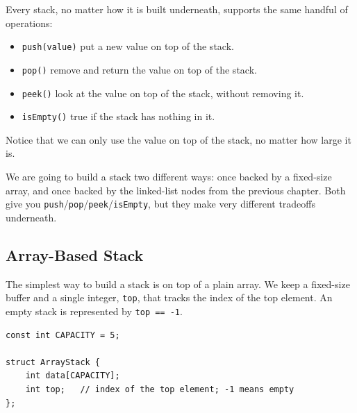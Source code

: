 Every stack, no matter how it is built underneath, supports the same handful of operations:

\begin{itemize}
    \item {}\texttt{push(value)} put a new value on top of the stack.
    \item {}\texttt{pop()} remove and return the value on top of the stack.
    \item {}\texttt{peek()} look at the value on top of the stack, without removing it.
    \item \texttt{isEmpty()} true if the stack has nothing in it.
\end{itemize}

Notice that we can only use the value on top of the stack, no matter how large it is.

We are going to build a stack two different ways: once backed by a fixed-size array, and once backed by the linked-list nodes from the previous chapter. Both give you \texttt{push}/\texttt{pop}/\texttt{peek}/\texttt{isEmpty}, but they make very different tradeoffs underneath.

\subsection{Array-Based Stack}

The simplest way to build a stack is on top of a plain array. We keep a fixed-size buffer and a single integer, \texttt{top}, that tracks the index of the top element. An empty stack is represented by \texttt{top == -1}.

\begin{verbatim}
const int CAPACITY = 5;

struct ArrayStack {
    int data[CAPACITY];
    int top;   // index of the top element; -1 means empty
};
\end{verbatim}

\begin{center}
\end{center}

